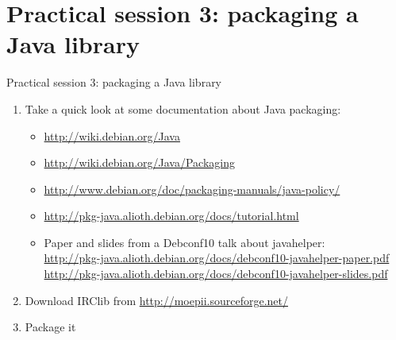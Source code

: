 \documentclass[10pt,final]{beamer}
\begin{document}
\section{Practical session 3: packaging a Java library}
\begin{frame}{Practical session 3: packaging a Java library}
\begin{enumerate}
	\item Take a quick look at some documentation about Java packaging:\\
		\begin{itemize}
		\item \url{http://wiki.debian.org/Java}
      \hbr
		\item \url{http://wiki.debian.org/Java/Packaging}
      \hbr
		\item \url{http://www.debian.org/doc/packaging-manuals/java-policy/}
      \hbr
		\item \url{http://pkg-java.alioth.debian.org/docs/tutorial.html}
      \hbr
		\item Paper and slides from a Debconf10 talk about javahelper:\\
			{\footnotesize
			\url{http://pkg-java.alioth.debian.org/docs/debconf10-javahelper-paper.pdf}\\
			\url{http://pkg-java.alioth.debian.org/docs/debconf10-javahelper-slides.pdf}}
		\end{itemize}
		\br
	\item Download IRClib from \url{http://moepii.sourceforge.net/}
		\br
	\item Package it
\end{enumerate}
\end{frame}

\backupbegin

\backupend
\end{document}
